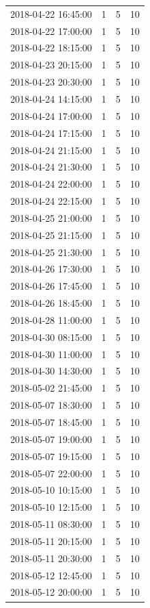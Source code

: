 \begin{tabular}{lrrr}
2018-04-22 16:45:00 & 1 & 5 & 10 \\
2018-04-22 17:00:00 & 1 & 5 & 10 \\
2018-04-22 18:15:00 & 1 & 5 & 10 \\
2018-04-23 20:15:00 & 1 & 5 & 10 \\
2018-04-23 20:30:00 & 1 & 5 & 10 \\
2018-04-24 14:15:00 & 1 & 5 & 10 \\
2018-04-24 17:00:00 & 1 & 5 & 10 \\
2018-04-24 17:15:00 & 1 & 5 & 10 \\
2018-04-24 21:15:00 & 1 & 5 & 10 \\
2018-04-24 21:30:00 & 1 & 5 & 10 \\
2018-04-24 22:00:00 & 1 & 5 & 10 \\
2018-04-24 22:15:00 & 1 & 5 & 10 \\
2018-04-25 21:00:00 & 1 & 5 & 10 \\
2018-04-25 21:15:00 & 1 & 5 & 10 \\
2018-04-25 21:30:00 & 1 & 5 & 10 \\
2018-04-26 17:30:00 & 1 & 5 & 10 \\
2018-04-26 17:45:00 & 1 & 5 & 10 \\
2018-04-26 18:45:00 & 1 & 5 & 10 \\
2018-04-28 11:00:00 & 1 & 5 & 10 \\
2018-04-30 08:15:00 & 1 & 5 & 10 \\
2018-04-30 11:00:00 & 1 & 5 & 10 \\
2018-04-30 14:30:00 & 1 & 5 & 10 \\
2018-05-02 21:45:00 & 1 & 5 & 10 \\
2018-05-07 18:30:00 & 1 & 5 & 10 \\
2018-05-07 18:45:00 & 1 & 5 & 10 \\
2018-05-07 19:00:00 & 1 & 5 & 10 \\
2018-05-07 19:15:00 & 1 & 5 & 10 \\
2018-05-07 22:00:00 & 1 & 5 & 10 \\
2018-05-10 10:15:00 & 1 & 5 & 10 \\
2018-05-10 12:15:00 & 1 & 5 & 10 \\
2018-05-11 08:30:00 & 1 & 5 & 10 \\
2018-05-11 20:15:00 & 1 & 5 & 10 \\
2018-05-11 20:30:00 & 1 & 5 & 10 \\
2018-05-12 12:45:00 & 1 & 5 & 10 \\
2018-05-12 20:00:00 & 1 & 5 & 10 \\

\end{tabular}
